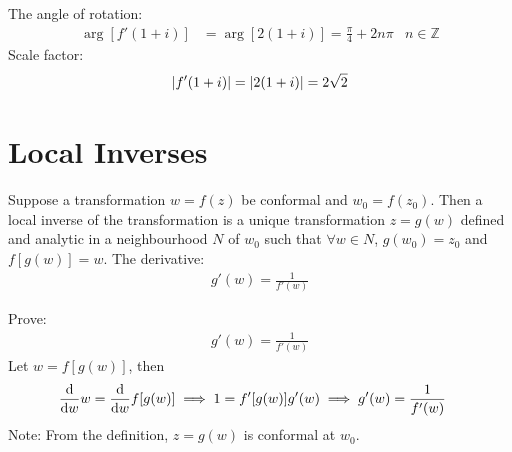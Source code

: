 \documentclass[12pt, english]{book}
\makeatletter
\renewenvironment{proof}[1][\proofname]{\par
	\pushQED{\qed}%
	\normalfont \topsep6\p@\@plus6\p@\relax
	\list{}{%
		\settowidth{\leftmargin}{\itshape\proofname:\hskip\labelsep}%
		\setlength{\labelwidth}{0pt}%
		\setlength{\itemindent}{-\leftmargin}%
		}%
	\item[\hskip\labelsep\itshape#1\@addpunct{:}]\ignorespaces
	}{\popQED\endlist\@endpefalse}
\makeatother
\begin{document}
\begin{example}
		The angle of rotation:
		\begin{align*}
			\arg[f'(1+i)] &= \arg[2(1+i)] = \frac{\pi}{4} + 2n \pi	&
				n \in \mathbb{Z}
		\end{align*}
		Scale factor:
		\begin{align*}
			\abs{f'(1+i)} = \abs{2(1+i)} = 2\sqrt{2}
		\end{align*}
	\end{example}
	
	\section{Local Inverses} \label{Local Inverses Section - Complex}
	
	\begin{definition}
		\label{Local Inverse Definition - Complex}
		Suppose a transformation \(w = f(z)\) be conformal and \(w_0 = f(z_0)\). Then a local inverse of the transformation is a unique transformation \(z = g(w)\) defined and analytic in a neighbourhood \(N\) of \(w_0\) such that \(\forall w \in N\), \(g(w_0) = z_0\) and \(f[g(w)] = w\). The derivative:
		\begin{align*}
			g'(w) = \frac{1}{f'(w)}
		\end{align*}
	\end{definition}
	\begin{proof}
		{\color{Grey}
		Prove: 
		\begin{align*}
			g'(w) = \frac{1}{f'(w)}
		\end{align*}
		Let \(w = f[g(w)]\), then 
		\begin{align*}
			\dv{w} w = \dv{w} f[g(w)]
			&\implies 1 = f'[g(w)] g'(w) 
			 \implies g'(w) = \frac{1}{f'(w)}
		\end{align*}}
	\end{proof}
	Note: From the definition, \(z = g(w)\) is conformal at \(w_0\).
	
\end{document}
